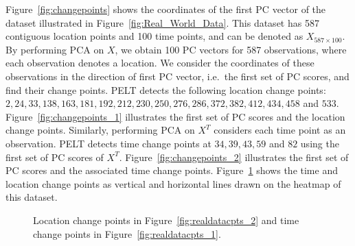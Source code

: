 \documentclass[a4paper,11pt]{article}
\begin{document}
Figure~\ref{fig:changepoints} shows the coordinates of the first PC vector of the dataset illustrated in Figure~\ref{fig:Real_World_Data}. This dataset has 587 contiguous location points and 100 time points, and can be denoted as $X_{587 \times 100}$. By performing PCA on $X$, we obtain 100 PC vectors for 587 observations, where each observation denotes a location. We consider the coordinates of these observations in the direction of first PC vector, i.e.\ the first set of PC scores, and find their change points. PELT detects the following location change points: $2, 24, 33, 138, 163, 181, 192, 212, 230, 250, 276, 286, 372, 382, 412, 434, 458$ and $533$. Figure~\ref{fig:changepoints_1} illustrates the first set of PC scores and the location change points. Similarly, performing PCA on $X^T$ considers each time point as an observation. PELT detects time change points at $34, 39, 43, 59$ and $82$ using the first set of PC scores of $X^T$. Figure~\ref{fig:changepoints_2} illustrates the first set of PC scores and the associated time change points. Figure~\ref{fig:realdatacpts} shows the time and location change points as vertical and horizontal lines drawn on the heatmap of this dataset.

\begin{figure}
	\centering
	\caption{Location change points in Figure~\ref{fig:realdatacpts_2} and time change points in Figure~\ref{fig:realdatacpts_1}.}
	\label{fig:realdatacpts}
\end{figure}
\end{document}
